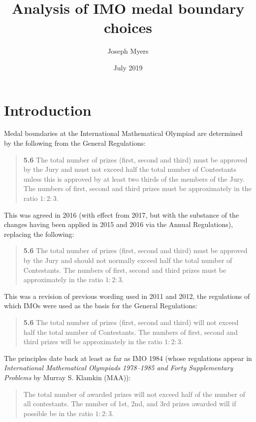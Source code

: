 \documentclass[a4paper,11pt]{article}
\begin{document}
\title{Analysis of IMO medal boundary choices}
\author{Joseph Myers}
\date{July 2019}
\maketitle

\section*{Introduction}

Medal boundaries at the International Mathematical Olympiad are
determined by the following from the General Regulations:

\begin{quote}
\textbf{5.6} The total number of prizes (first, second and third) must
be approved by the Jury and must not exceed half the total number of
Contestants unless this is approved by at least two thirds of the
members of the Jury. The numbers of first, second and third prizes
must be approximately in the ratio $1:2:3$.
\end{quote}

This was agreed in 2016 (with effect from 2017, but with the substance
of the changes having been applied in 2015 and 2016 via the Annual
Regulations), replacing the following:

\begin{quote}
\textbf{5.6} The total number of prizes (first, second and third) must
be approved by the Jury and should not normally exceed half the total
number of Contestants. The numbers of first, second and third prizes
must be approximately in the ratio $1:2:3$.
\end{quote}

This was a revision of previous wording used in 2011 and 2012, the
regulations of which IMOs were used as the basis for the General
Regulations:

\begin{quote}
\textbf{5.6} The total number of prizes (first, second and third) will
not exceed half the total number of Contestants. The numbers of first,
second and third prizes will be approximately in the ratio $1:2:3$.
\end{quote}

The principles date back at least as far as IMO 1984 (whose
regulations appear in \textit{International Mathematical Olympiads
  1978--1985 and Forty Supplementary Problems} by Murray S. Klamkin
(MAA)):

\begin{quote}
The total number of awarded prizes will not exceed half of the number
of all contestants.  The number of 1st, 2nd, and 3rd prizes awarded
will if possible be in the ratio $1:2:3$.
\end{quote}
\end{document}
